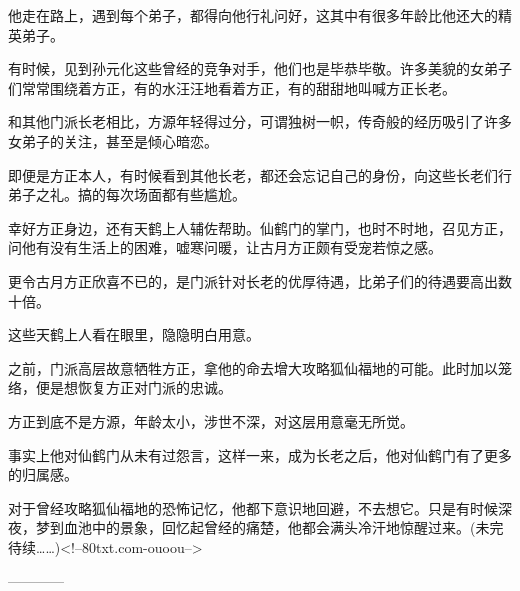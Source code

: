 \begin{this_body}
他走在路上，遇到每个弟子，都得向他行礼问好，这其中有很多年龄比他还大的精英弟子。

有时候，见到孙元化这些曾经的竞争对手，他们也是毕恭毕敬。许多美貌的女弟子们常常围绕着方正，有的水汪汪地看着方正，有的甜甜地叫喊方正长老。

和其他门派长老相比，方源年轻得过分，可谓独树一帜，传奇般的经历吸引了许多女弟子的关注，甚至是倾心暗恋。

即便是方正本人，有时候看到其他长老，都还会忘记自己的身份，向这些长老们行弟子之礼。搞的每次场面都有些尴尬。

幸好方正身边，还有天鹤上人辅佐帮助。仙鹤门的掌门，也时不时地，召见方正，问他有没有生活上的困难，嘘寒问暖，让古月方正颇有受宠若惊之感。

更令古月方正欣喜不已的，是门派针对长老的优厚待遇，比弟子们的待遇要高出数十倍。

这些天鹤上人看在眼里，隐隐明白用意。

之前，门派高层故意牺牲方正，拿他的命去增大攻略狐仙福地的可能。此时加以笼络，便是想恢复方正对门派的忠诚。

方正到底不是方源，年龄太小，涉世不深，对这层用意毫无所觉。

事实上他对仙鹤门从未有过怨言，这样一来，成为长老之后，他对仙鹤门有了更多的归属感。

对于曾经攻略狐仙福地的恐怖记忆，他都下意识地回避，不去想它。只是有时候深夜，梦到血池中的景象，回忆起曾经的痛楚，他都会满头冷汗地惊醒过来。(未完待续……)<!--80txt.com-ouoou-->

------------

\end{this_body}

